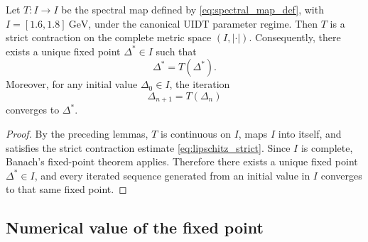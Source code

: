 \begin{theorem}
Let \(T:I\to I\) be the spectral map defined by \eqref{eq:spectral_map_def}, with \(I=[1.6,1.8]\ \mathrm{GeV}\), under the canonical UIDT parameter regime. Then \(T\) is a strict contraction on the complete metric space \((I,|\cdot|)\). Consequently, there exists a unique fixed point \(\Delta^*\in I\) such that
\begin{equation}
\Delta^*=T(\Delta^*).
\label{eq:fixed_point_result}
\end{equation}
Moreover, for any initial value \(\Delta_0\in I\), the iteration
\begin{equation}
\Delta_{n+1}=T(\Delta_n)
\label{eq:iteration_scheme}
\end{equation}
converges to \(\Delta^*\).
\end{theorem}

\begin{proof}
By the preceding lemmas, \(T\) is continuous on \(I\), maps \(I\) into itself, and satisfies the strict contraction estimate \eqref{eq:lipschitz_strict}. Since \(I\) is complete, Banach's fixed-point theorem applies. Therefore there exists a unique fixed point \(\Delta^*\in I\), and every iterated sequence generated from an initial value in \(I\) converges to that same fixed point.
\end{proof}

\subsection{Numerical value of the fixed point}

